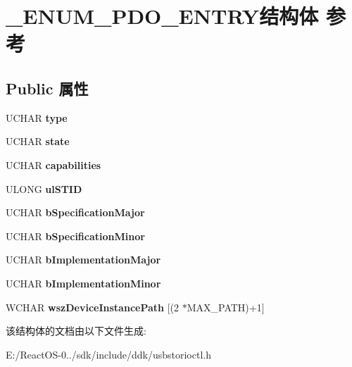 \hypertarget{struct___e_n_u_m___p_d_o___e_n_t_r_y}{}\section{\+\_\+\+E\+N\+U\+M\+\_\+\+P\+D\+O\+\_\+\+E\+N\+T\+R\+Y结构体 参考}
\label{struct___e_n_u_m___p_d_o___e_n_t_r_y}
\subsection*{Public 属性}
\begin{DoxyCompactItemize}
\item 
\mbox{\label{struct___e_n_u_m___p_d_o___e_n_t_r_y_a33eea1d3eaf3475266ad841f2f31c2bd}} 
U\+C\+H\+AR {\bfseries type}
\item 
\mbox{\label{struct___e_n_u_m___p_d_o___e_n_t_r_y_a3a6eb831b7b92f16acf37ef48a93628c}} 
U\+C\+H\+AR {\bfseries state}
\item 
\mbox{\label{struct___e_n_u_m___p_d_o___e_n_t_r_y_a4ae201d77d4e5fb949dd10b50f8d8dcf}} 
U\+C\+H\+AR {\bfseries capabilities}
\item 
\mbox{\label{struct___e_n_u_m___p_d_o___e_n_t_r_y_aec24bb61c3acd80144466f6bdc45af20}} 
U\+L\+O\+NG {\bfseries ul\+S\+T\+ID}
\item 
\mbox{\label{struct___e_n_u_m___p_d_o___e_n_t_r_y_a9551c9f05e4b4f3755455356891b4492}} 
U\+C\+H\+AR {\bfseries b\+Specification\+Major}
\item 
\mbox{\label{struct___e_n_u_m___p_d_o___e_n_t_r_y_a661c3ff065ec9d96afde7d368050d1c8}} 
U\+C\+H\+AR {\bfseries b\+Specification\+Minor}
\item 
\mbox{\label{struct___e_n_u_m___p_d_o___e_n_t_r_y_abdd0915402f566f108b48ba71ba3c50f}} 
U\+C\+H\+AR {\bfseries b\+Implementation\+Major}
\item 
\mbox{\label{struct___e_n_u_m___p_d_o___e_n_t_r_y_a82daa1bf6d6575526ea1265eb11ad580}} 
U\+C\+H\+AR {\bfseries b\+Implementation\+Minor}
\item 
\mbox{\label{struct___e_n_u_m___p_d_o___e_n_t_r_y_afc5bd8550f4909d769ee8f1c8c8c9b77}} 
W\+C\+H\+AR {\bfseries wsz\+Device\+Instance\+Path} \mbox{[}(2 $\ast$M\+A\+X\+\_\+\+P\+A\+TH)+1\mbox{]}
\end{DoxyCompactItemize}


该结构体的文档由以下文件生成\+:\begin{DoxyCompactItemize}
\item 
E\+:/\+React\+O\+S-\/0../sdk/include/ddk/usbstorioctl.\+h\end{DoxyCompactItemize}
